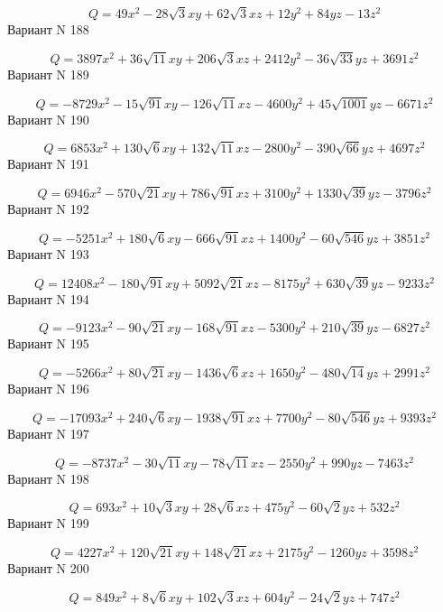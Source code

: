 \documentclass[11pt]{report}
\begin{document}
$$Q = 49 x^{2} - 28 \sqrt{3} x y + 62 \sqrt{3} x z + 12 y^{2} + 84 y z - 13 z^{2}$$Вариант N 188

$$Q = 3897 x^{2} + 36 \sqrt{11} x y + 206 \sqrt{3} x z + 2412 y^{2} - 36 \sqrt{33} y z + 3691 z^{2}$$Вариант N 189

$$Q = - 8729 x^{2} - 15 \sqrt{91} x y - 126 \sqrt{11} x z - 4600 y^{2} + 45 \sqrt{1001} y z - 6671 z^{2}$$Вариант N 190

$$Q = 6853 x^{2} + 130 \sqrt{6} x y + 132 \sqrt{11} x z - 2800 y^{2} - 390 \sqrt{66} y z + 4697 z^{2}$$Вариант N 191

$$Q = 6946 x^{2} - 570 \sqrt{21} x y + 786 \sqrt{91} x z + 3100 y^{2} + 1330 \sqrt{39} y z - 3796 z^{2}$$Вариант N 192

$$Q = - 5251 x^{2} + 180 \sqrt{6} x y - 666 \sqrt{91} x z + 1400 y^{2} - 60 \sqrt{546} y z + 3851 z^{2}$$Вариант N 193

$$Q = 12408 x^{2} - 180 \sqrt{91} x y + 5092 \sqrt{21} x z - 8175 y^{2} + 630 \sqrt{39} y z - 9233 z^{2}$$Вариант N 194

$$Q = - 9123 x^{2} - 90 \sqrt{21} x y - 168 \sqrt{91} x z - 5300 y^{2} + 210 \sqrt{39} y z - 6827 z^{2}$$Вариант N 195

$$Q = - 5266 x^{2} + 80 \sqrt{21} x y - 1436 \sqrt{6} x z + 1650 y^{2} - 480 \sqrt{14} y z + 2991 z^{2}$$Вариант N 196

$$Q = - 17093 x^{2} + 240 \sqrt{6} x y - 1938 \sqrt{91} x z + 7700 y^{2} - 80 \sqrt{546} y z + 9393 z^{2}$$Вариант N 197

$$Q = - 8737 x^{2} - 30 \sqrt{11} x y - 78 \sqrt{11} x z - 2550 y^{2} + 990 y z - 7463 z^{2}$$Вариант N 198

$$Q = 693 x^{2} + 10 \sqrt{3} x y + 28 \sqrt{6} x z + 475 y^{2} - 60 \sqrt{2} y z + 532 z^{2}$$Вариант N 199

$$Q = 4227 x^{2} + 120 \sqrt{21} x y + 148 \sqrt{21} x z + 2175 y^{2} - 1260 y z + 3598 z^{2}$$Вариант N 200

$$Q = 849 x^{2} + 8 \sqrt{6} x y + 102 \sqrt{3} x z + 604 y^{2} - 24 \sqrt{2} y z + 747 z^{2}$$
\end{document}
